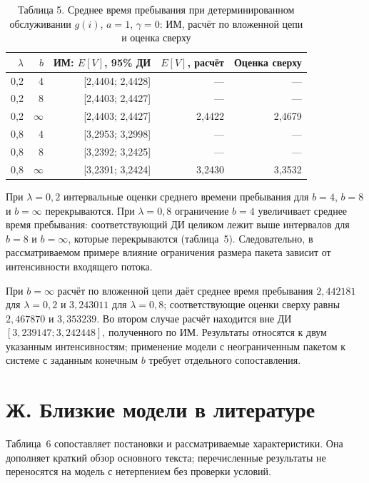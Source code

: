 \begin{table}[htbp]\centering\small
\caption{Таблица 5. Среднее время пребывания при детерминированном обслуживании $g(i)$, $a=1$, $\gamma=0$: ИМ, расчёт по вложенной цепи и оценка сверху}
\begin{tabular}{rrrrr}
\hline
$\lambda$ & $b$ & ИМ: $E[V]$, 95\% ДИ & $E[V]$, расчёт & Оценка сверху \\
\hline
0,2 & 4 & [2,4404; 2,4428] & --- & --- \\
0,2 & 8 & [2,4403; 2,4427] & --- & --- \\
0,2 & $\infty$ & [2,4403; 2,4427] & 2,4422 & 2,4679 \\
0,8 & 4 & [3,2953; 3,2998] & --- & --- \\
0,8 & 8 & [3,2392; 3,2425] & --- & --- \\
0,8 & $\infty$ & [3,2391; 3,2424] & 3,2430 & 3,3532 \\
\hline
\end{tabular}

\end{table}

При $\lambda=0{,}2$ интервальные оценки среднего времени пребывания для $b=4$, $b=8$ и $b=\infty$ перекрываются. При $\lambda=0{,}8$ ограничение $b=4$ увеличивает среднее время пребывания: соответствующий ДИ целиком лежит выше интервалов для $b=8$ и $b=\infty$, которые перекрываются (таблица~5). Следовательно, в рассматриваемом примере влияние ограничения размера пакета зависит от интенсивности входящего потока.

При $b=\infty$ расчёт по вложенной цепи даёт среднее время пребывания $2{,}442181$ для $\lambda=0{,}2$ и $3{,}243011$ для $\lambda=0{,}8$; соответствующие оценки сверху равны $2{,}467870$ и $3{,}353239$. Во втором случае расчёт находится вне ДИ $[3{,}239147;3{,}242448]$, полученного по ИМ. Результаты относятся к двум указанным интенсивностям; применение модели с неограниченным пакетом к системе с заданным конечным $b$ требует отдельного сопоставления.

\section*{Ж. Близкие модели в литературе}

Таблица~6 сопоставляет постановки и рассматриваемые характеристики. Она дополняет краткий обзор основного текста; перечисленные результаты не переносятся на модель с нетерпением без проверки условий.


